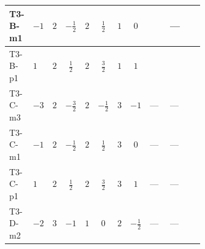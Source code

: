 \documentclass[8pt]{article}
\begin{document}
\begin{landscape}
\begin{longtable}{@{}llcccccc >{\raggedright\arraybackslash}p{0.21\linewidth} >{\raggedright\arraybackslash}p{0.21\linewidth} >{\raggedright\arraybackslash}p{0.21\linewidth}@{}}
\midrule
T3-B-m1 & $-1$ & $2$ & $-\frac{1}{2}$ & $2$ & $\frac{1}{2}$ & $1$ & $0$ & \scriptsize\adjustbox{max width=\linewidth}{$\begin{gathered} +T_{\nu}^{(2)} \left({y_2}\right)_{ij}\end{gathered}$} & --- & \scriptsize\adjustbox{max width=\linewidth}{$\begin{gathered} -\frac{9}{4} {g_2}^2 \left({y_2}\right)_{ij}\end{gathered}$} \\
\midrule
T3-B-p1 & $1$ & $2$ & $\frac{1}{2}$ & $2$ & $\frac{3}{2}$ & $1$ & $1$ & \scriptsize\adjustbox{max width=\linewidth}{$\begin{gathered} T_{\nu}^{(2)} \left({y_2}\right)_{ij}\end{gathered}$} & \scriptsize\adjustbox{max width=\linewidth}{$\begin{gathered} +\frac{1}{2} (\left({y_1}\,\left({y_1}\right)^{\dagger}\,{y_2}\right)_{ij}+\left({Y_e}\,\left({Y_e}\right)^{\dagger}\,{y_2}\right)_{ij}+3 \left({y_2}\,\left({y_2}\right)^{\dagger}\,{y_2}\right)_{ij})\end{gathered}$} & \scriptsize\adjustbox{max width=\linewidth}{$\begin{gathered} -\frac{9}{4} {g_2}^2 \left({y_2}\right)_{ij}\end{gathered}$} \\
\midrule
T3-C-m3 & $-3$ & $2$ & $-\frac{3}{2}$ & $2$ & $-\frac{1}{2}$ & $3$ & $-1$ & --- & --- & \scriptsize\adjustbox{max width=\linewidth}{$\begin{gathered} -\frac{33}{4} {g_2}^2 \left({y_2}\right)_{ij}\end{gathered}$} \\
\midrule
T3-C-m1 & $-1$ & $2$ & $-\frac{1}{2}$ & $2$ & $\frac{1}{2}$ & $3$ & $0$ & --- & --- & \scriptsize\adjustbox{max width=\linewidth}{$\begin{gathered} -\frac{33}{4} {g_2}^2 \left({y_2}\right)_{ij}\end{gathered}$} \\
\midrule
T3-C-p1 & $1$ & $2$ & $\frac{1}{2}$ & $2$ & $\frac{3}{2}$ & $3$ & $1$ & --- & --- & \scriptsize\adjustbox{max width=\linewidth}{$\begin{gathered} -\frac{33}{4} {g_2}^2 \left({y_2}\right)_{ij}\end{gathered}$} \\
\midrule
T3-D-m2 & $-2$ & $3$ & $-1$ & $1$ & $0$ & $2$ & $-\frac{1}{2}$ & --- & --- & \scriptsize\adjustbox{max width=\linewidth}{$\begin{gathered} -\frac{9}{2} {g_2}^2 \left({y_2}\right)_{ij}\end{gathered}$} \\

\end{longtable}
\end{landscape}
\end{document}

